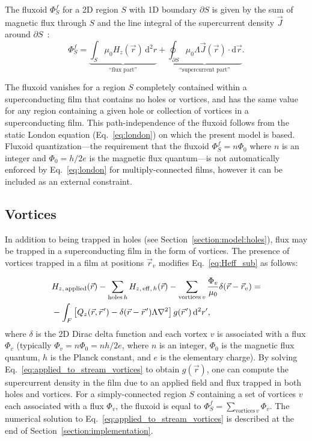 \documentclass[final,3p,times,twocolumn]{elsarticle}
\newcommand{\pvec}[1]{\vec{#1}\mkern2mu\vphantom{#1}}
\newcounter{bla}
\begin{document}
The fluxoid $\Phi^f_S$ for a 2D region $S$ with 1D boundary $\partial S$ is given by the sum of magnetic flux through $S$ and the line integral of the supercurrent density $\vec{J}$ around $\partial S$~\cite{Brandt2005-wj,Clem2005-ye,Tinkham2004-zn}:
\begin{equation}
    \Phi^f_S = \underbrace{\int_S\mu_0H_z(\vec{r})\,\mathrm{d}^2r}_\text{``flux part''} + \underbrace{\oint_{\partial S}\mu_0\Lambda\vec{J}(\vec{r})\cdot\mathrm{d}\vec{r}}_\text{``supercurrent part''}.
    \label{eq:fluxoid}
\end{equation}

The fluxoid vanishes for a region $S$ completely contained within a superconducting film that contains no holes or vortices, and has the same value for any region containing a given hole or collection of vortices in a superconducting film. This path-independence of the fluxoid follows from the static London equation (Eq.~\ref{eq:london}) on which the present model is based. Fluxoid quantization---the requirement that the fluxoid $\Phi^f_S=n\Phi_0$ where $n$ is an integer and $\Phi_0=h/2e$ is the magnetic flux quantum---is not automatically enforced by Eq.~\ref{eq:london} for multiply-connected films, however it can be included as an external constraint.

\subsection{Vortices}
\label{section:model:vortices}
In addition to being trapped in holes (see Section~\ref{section:model:holes}), flux may be trapped in a superconducting film in the form of vortices. The presence of vortices trapped in a film at positions $\vec{r}_v$ modifies Eq.~\ref{eq:Heff_sub} as follows:

\begin{align}
\begin{split}
    \label{eq:applied_to_stream_vortices}
    & H_{z,\,\mathrm{applied}}(\vec{r}) - \sum_{\mathrm{holes}\,h} H_{z,\,\mathrm{eff},\,h}(\vec{r}) - \sum_{\mathrm{vortices}\,v}\frac{\Phi_v}{\mu_0}\delta(\vec{r}-\vec{r}_v)
    = \\
    &-\int_F\left[
        Q_z(\vec{r},\pvec{r}')-\delta(\vec{r}-\pvec{r}')\Lambda\nabla^2\right
    ]g(\pvec{r}')\,\mathrm{d}^2r',
\end{split}
\end{align}
where $\delta$ is the 2D Dirac delta function and each vortex $v$ is associated with a flux $\Phi_v$ (typically $\Phi_v=n\Phi_0=nh/2e$, where $n$ is an integer, $\Phi_0$ is the magnetic flux quantum, $h$ is the Planck constant, and $e$ is the elementary charge). By solving Eq.~\ref{eq:applied_to_stream_vortices} to obtain $g(\vec{r})$, one can compute the supercurrent density in the film due to an applied field and flux trapped in both holes and vortices. For a simply-connected region $S$ containing a set of vortices $v$ each associated with a flux $\Phi_v$, the fluxoid is equal to $\Phi^f_S=\sum_{\mathrm{vortices}\,v}\Phi_v$. The numerical solution to Eq.~\ref{eq:applied_to_stream_vortices} is described at the end of Section~\ref{section:implementation}.
\end{document}
